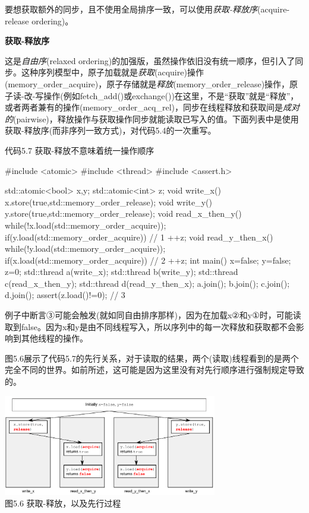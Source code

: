 要想获取额外的同步，且不使用全局排序一致，可以使用\textit{获取-释放序}(acquire-release ordering)。

\textbf{获取-释放序}

这是\textit{自由序}(relaxed ordering)的加强版，虽然操作依旧没有统一顺序，但引入了同步。这种序列模型中，原子加载就是\textit{获取}(acquire)操作(memory\_order\_acquire)，原子存储就是\textit{释放}(memory\_order\_release)操作，原子读-改-写操作(例如fetch\_add()或exchange())在这里，不是“获取”就是“释放”，或者两者兼有的操作(memory\_order\_acq\_rel)，同步在线程释放和获取间是\textit{成对的}(pairwise)，释放操作与获取操作同步就能读取已写入的值。下面列表中是使用获取-释放序(而非序列一致方式)，对代码5.4的一次重写。

代码5.7 获取-释放不意味着统一操作顺序

\begin{cpp}
#include <atomic>
#include <thread>
#include <assert.h>

std::atomic<bool> x,y;
std::atomic<int> z;
void write_x()
{
  x.store(true,std::memory_order_release);
}
void write_y()
{
  y.store(true,std::memory_order_release);
}
void read_x_then_y()
{
  while(!x.load(std::memory_order_acquire));
  if(y.load(std::memory_order_acquire))  // 1
    ++z;
}
void read_y_then_x()
{
  while(!y.load(std::memory_order_acquire));
  if(x.load(std::memory_order_acquire))  // 2
    ++z;
}
int main()
{
  x=false;
  y=false;
  z=0;
  std::thread a(write_x);
  std::thread b(write_y);
  std::thread c(read_x_then_y);
  std::thread d(read_y_then_x);
  a.join();
  b.join();
  c.join();
  d.join();
  assert(z.load()!=0); // 3
}
\end{cpp}

例子中断言③可能会触发(就如同自由排序那样)，因为在加载x②和y①时，可能读取到false。因为x和y是由不同线程写入，所以序列中的每一次释放和获取都不会影响到其他线程的操作。

图5.6展示了代码5.7的先行关系，对于读取的结果，两个(读取)线程看到的是两个完全不同的世界。如前所述，这可能是因为这里没有对先行顺序进行强制规定导致的。


\begin{center}
    \includegraphics[width=0.7\textwidth]{content/chapter05/images/5-6.png}\\
    图5.6 获取-释放，以及先行过程
\end{center}

